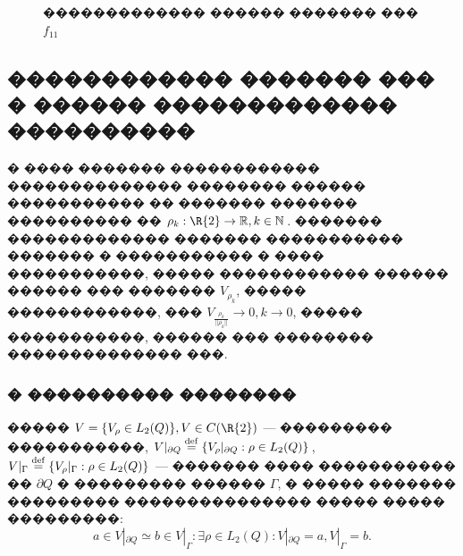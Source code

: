 \documentclass[a4paper]{article}
\begin{document}
\begin{figure}[h]
\begin{minipage}[h]{0.49\linewidth}
  \end{minipage}
  \caption{������������� ������ ������� ��� $f_{11}$}
  \label{d3end}
\end{figure}

\FloatBarrier
\subsection{������������ ������� ��� � ������ ������������� ����������}
� ���� ������� ������������ �������������� �������� ������ ����������� �� ������� ������� ���������� �� $\rho_k: \R{2}\rightarrow \mathbb{R}, k \in \mathbb{N}$.
������� ������������� ������� ����������� ������� � ����������� � ���� �����������, ����� ������������ ������ ������ ��� ������� $V_{\rho_k}$, ����� ������������, ��� $V_{\frac{\rho_k}{||\rho_k||}} \rightarrow 0, k \rightarrow 0$, ����� �����������, ������ ��� �������� �������������� ���.

\subsubsection{� ���������� ��������}
�����
$V = \{V_{\rho} \in L_2(Q)\}, V \in C(\R{2})$ --- ��������� �����������,
\def\MYdef{\mathrel{\stackrel{\rm def}=}}
$V|_{\partial Q}\MYdef \{V_{\rho}|_{\partial Q}: \rho \in L_2(Q)\}$,
$V|_{\Gamma} \MYdef \{V_{\rho}|_{\Gamma}: \rho \in L_2(Q)\}$ --- ������� ���� ����������� �� $\partial Q$ � ��������� ������ $\Gamma$,
� ����� ������� ��������� ��������������� ����� ����� ���������:
$$a \in V|_{\partial Q} \simeq b \in V|_{\Gamma}: \exists \rho \in L_2(Q):V|_{\partial Q}=a,V|_{\Gamma}=b.$$
\end{document}
